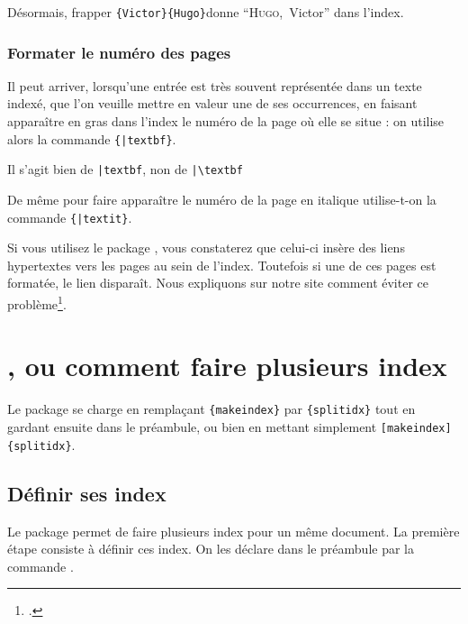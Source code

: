 Désormais, frapper \verb|{Victor}{Hugo}|donne
 \enquote{\textsc{Hugo},~Victor} dans l'index.
 
 

\subsubsection{Formater le numéro des pages}

Il peut arriver, lorsqu'une entrée est très souvent représentée dans un texte indexé, que l'on veuille mettre en valeur une de ses occurrences, en faisant apparaître en gras dans l'index le numéro de la page où elle se situe : on utilise alors la commande \verb|{|\verb+|textbf}+. 

\begin{attention}
Il s'agit bien de \verb+|textbf+, non de \verb+|\textbf+
\end{attention}

De même pour faire apparaître le numéro de la page en italique utilise-t-on la commande \verb|{|\verb+|textit}+.





\begin{plusloins}
Si vous utilisez le package , vous constaterez que celui-ci insère des liens hypertextes vers les pages au sein de l'index. Toutefois si une de ces pages est formatée, le lien disparaît. Nous expliquons sur notre site comment éviter ce problème\footcite{indexhypergras}.
\end{plusloins}



\section{, ou comment faire plusieurs index} \label{splitindex}


Le package se charge en remplaçant \verb|{makeindex}| par \verb|{splitidx}| tout en gardant ensuite  dans le préambule, ou bien en mettant simplement  \verb|[makeindex]{splitidx}|.

\subsection{Définir ses index}

Le package  permet de faire plusieurs index pour un même document. La première étape consiste à définir ces index. On les déclare dans le préambule par la commande .



